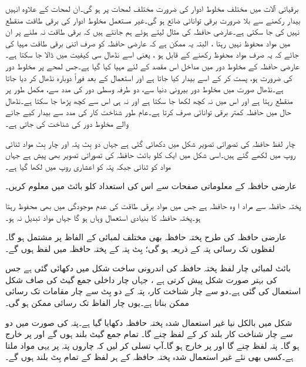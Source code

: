 برقیاتی آلات میں مختلف مخلوط ادوار کی  ضرورت مختلف   لمحات  پر  ہو گی۔ان لمحات کے علاوہ انہیں بیدار رکھنے سے بلا ضرورت برقی توانائی   ضائع ہو گی۔غیر مستعمل  مخلوط ادوار کی برقی طاقت منقطع نہیں کی جا سکتی ہے۔عارضی حافظہ کی مثال لیتے  ہوئے ہم  جانتے ہیں  کہ برقی طاقت نہ ملنے پر ان میں مواد محفوظ نہیں رہتا ، البتہ یہ  ممکن ہے کہ عارضی حافظہ کو صرف اتنی برقی طاقت مہیا کی جائے کہ یہ صرف مواد محفوظ رکھنے کے قابل ہو ، یعنی اسے  نڈھال سی کیفیت میں ڈالا جا سکتا ہے۔عارضی حافظہ کے مخلوط دور میں   مداخل اس مقصد کے لئے مہیا کیا گیا ہے۔جس لمحے پر مخلوط دور کی ضرورت ہو،      پست کر کے اسے بیدار کیا جاتا ہے اور استعمال کے بعد فوراً دوبارہ نڈھال کر دیا جاتا ہے۔نڈھال صورت میں مخلوط دور بیرونی دنیا سے، دو طرفہ وسطی دور کی مدد سے، مکمل طور  پر منقطع رہتا ہے اور اس میں نہ کچھ لکھا جا سکتا ہے اور نہ ہی اس سے کچھ پڑھا جا سکتا ہے۔نڈھال حال  میں حافظہ کمتر برقی توانائی صرف کرتا   ہے۔عام طور شناخت کار کی مدد سے   بیدار کیے جانے والے مخلوط دور کی  شناخت کی جاتی ہے۔



چار  لفظ  حافظہ کی تصوراتی تصویر شکل  میں دکھائی گئی ہے جہاں دو بِٹ پتہ اور چار بِٹ مواد   ثنائی  روپ میں لکھے    گئے   ہیں۔اسی شکل میں ایک کلو بائٹ حافظہ کی تصوراتی تصویر بھی  پیش ہے جہاں مواد کو ثنائی جبکہ پتہ کو اعشاری  روپ میں لکھا گیا ہے۔

عارضی حافظہ  کے معلوماتی صفحات سے اس کی  استعداد  کلو بائٹ میں   معلوم  کریں۔



پختہ حافظہ سے مراد ا وہ حافظہ ہے جس میں مواد برقی طاقت کی عدم موجودگی میں بھی محفوظ رہتا ہو۔پختہ حافظہ کا بنیادی استعمال وہاں ہو گا جہاں مواد تبدیل نہ ہو۔

عارضی حافظہ کی طرح پختہ حافظہ بھی مختلف لمبائی کے الفاظ پر مشتمل ہو گا۔لفظوں تک رسائی   پتہ کے ذریعہ  ہو گی؛  بِٹ پتہ کے پختہ حافظہ میں   لفظ ہوں گے۔

بائٹ لمبائی  چار  لفظ  پختہ حافظہ کی اندرونی ساخت شکل  میں دکھائی گئی ہے جس کی بہتر صورت  شکل   پیش کرتی ہے ،  جہاں چار داخلی جمع گیٹ کی صاف شکل استعمال کی گئی ہے۔دو سے چار شناخت کار، پتہ کے دو بِٹ سے چار مقامات  تک رسائی ممکن بناتا ہے۔یوں چار الفاظ تک رسائی ممکن ہو گی۔



شکل   میں بالکل نیا غیر استعمال شدہ پختہ حافظہ دکھایا گیا ہے۔پتہ      کی صورت میں دو سے چار شناخت کار   بلند کر کے لفظ   چنے گا۔ تمام جمع گیٹ بلند ہوں گے اور  پر  خارج ہو گا۔ پتہ   لفظ   چنے گا اور  پر  خارج ہو گا۔آپ تسلی کر لیں کہ چاروں پتہ پر یہی مواد ملتا ہے۔کسی بھی نئے غیر استعمال شدہ پختہ حافظہ کے ہر لفظ کے تمام بِٹ بلند   ہوں گے۔


